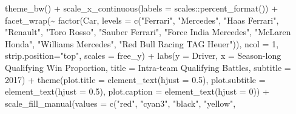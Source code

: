 \documentclass[
]{book}
\newenvironment{Shaded}{\begin{snugshade}}{\end{snugshade}}
\newcommand{\AttributeTok}[1]{\textcolor[rgb]{0.77,0.63,0.00}{#1}}
\newcommand{\DecValTok}[1]{\textcolor[rgb]{0.00,0.00,0.81}{#1}}
\newcommand{\FloatTok}[1]{\textcolor[rgb]{0.00,0.00,0.81}{#1}}
\newcommand{\FunctionTok}[1]{\textcolor[rgb]{0.00,0.00,0.00}{#1}}
\newcommand{\NormalTok}[1]{#1}
\newcommand{\SpecialCharTok}[1]{\textcolor[rgb]{0.00,0.00,0.00}{#1}}
\newcommand{\StringTok}[1]{\textcolor[rgb]{0.31,0.60,0.02}{#1}}
\begin{document}
\begin{Shaded}
\begin{Highlighting}[]
  \FunctionTok{theme\_bw}\NormalTok{() }\SpecialCharTok{+}
  \FunctionTok{scale\_x\_continuous}\NormalTok{(}\AttributeTok{labels =}\NormalTok{ scales}\SpecialCharTok{::}\FunctionTok{percent\_format}\NormalTok{()) }\SpecialCharTok{+}
  \FunctionTok{facet\_wrap}\NormalTok{(}\SpecialCharTok{\textasciitilde{}} \FunctionTok{factor}\NormalTok{(Car,}
                      \AttributeTok{levels =} \FunctionTok{c}\NormalTok{(}\StringTok{"Ferrari"}\NormalTok{,}
                                 \StringTok{"Mercedes"}\NormalTok{,}
                                 \StringTok{"Haas Ferrari"}\NormalTok{,}
                                 \StringTok{"Renault"}\NormalTok{,}
                                 \StringTok{"Toro Rosso"}\NormalTok{,}
                                 \StringTok{"Sauber Ferrari"}\NormalTok{, }
                                 \StringTok{"Force India Mercedes"}\NormalTok{,}
                                 \StringTok{"McLaren Honda"}\NormalTok{,}
                                 \StringTok{"Williams Mercedes"}\NormalTok{,}
                                 \StringTok{"Red Bull Racing TAG Heuer"}\NormalTok{)), }\AttributeTok{ncol =} \DecValTok{1}\NormalTok{, }\AttributeTok{strip.position=}\StringTok{"top"}\NormalTok{, }\AttributeTok{scales =} \StringTok{\textquotesingle{}free\_y\textquotesingle{}}\NormalTok{) }\SpecialCharTok{+}
  \FunctionTok{labs}\NormalTok{(}\AttributeTok{y =} \StringTok{\textquotesingle{}Driver\textquotesingle{}}\NormalTok{,}
       \AttributeTok{x =} \StringTok{\textquotesingle{}Season{-}long Qualifying Win Proportion\textquotesingle{}}\NormalTok{,}
       \AttributeTok{title =} \StringTok{\textquotesingle{}Intra{-}team Qualifying Battles\textquotesingle{}}\NormalTok{,}
       \AttributeTok{subtitle =} \StringTok{\textquotesingle{}2017\textquotesingle{}}\NormalTok{) }\SpecialCharTok{+}
  \FunctionTok{theme}\NormalTok{(}\AttributeTok{plot.title =} \FunctionTok{element\_text}\NormalTok{(}\AttributeTok{hjust =} \FloatTok{0.5}\NormalTok{),}
        \AttributeTok{plot.subtitle =} \FunctionTok{element\_text}\NormalTok{(}\AttributeTok{hjust =} \FloatTok{0.5}\NormalTok{),}
        \AttributeTok{plot.caption =} \FunctionTok{element\_text}\NormalTok{(}\AttributeTok{hjust =} \DecValTok{0}\NormalTok{)) }\SpecialCharTok{+}
  \FunctionTok{scale\_fill\_manual}\NormalTok{(}\AttributeTok{values =} \FunctionTok{c}\NormalTok{(}\StringTok{"red"}\NormalTok{, }
                                \StringTok{"cyan3"}\NormalTok{,  }
                                \StringTok{"black"}\NormalTok{, }
                                \StringTok{"yellow"}\NormalTok{,}

\end{Highlighting}
\end{Shaded}
\end{document}
